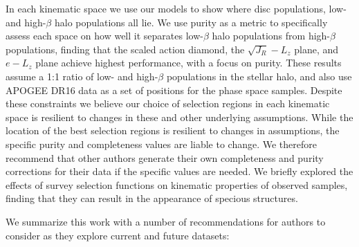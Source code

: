 In each kinematic space we use our models to show where disc populations, low- and high-$\beta$ halo populations all lie. We use purity as a metric to specifically assess each space on how well it separates low-$\beta$ halo populations from high-$\beta$ populations, finding that the scaled action diamond, the $\sqrt{J_{R}}-L_{z}$ plane, and $e-L_{z}$ plane achieve highest performance, with a focus on purity. These results assume a 1:1 ratio of low- and high-$\beta$ populations in the stellar halo, and also use APOGEE DR16 data as a set of positions for the phase space samples. Despite these constraints we believe our choice of selection regions in each kinematic space is resilient to changes in these and other underlying assumptions. While the location of the best selection regions is resilient to changes in assumptions, the specific purity and completeness values are liable to change. We therefore recommend that other authors generate their own completeness and purity corrections for their data if the specific values are needed. We briefly explored the effects of survey selection functions on kinematic properties of observed samples, finding that they can result in the appearance of specious structures.

We summarize this work with a number of recommendations for authors to consider as they explore current and future datasets:


